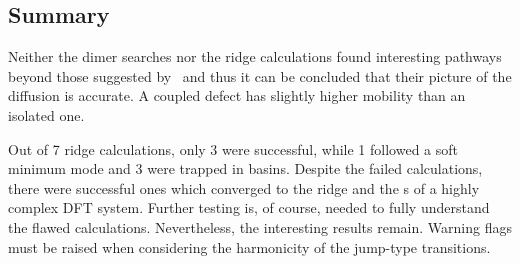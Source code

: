 \subsection{Summary}
Neither the dimer searches nor the ridge calculations found interesting pathways beyond those suggested by~\cite{double-defect-2011} and thus it can be concluded that their picture of the diffusion is accurate.
A coupled defect has slightly higher mobility than an isolated one.

Out of 7 ridge calculations, only 3 were successful, while 1 followed a soft minimum mode and 3 were trapped in basins.
Despite the failed calculations, there were successful ones which converged to the ridge and the s of a highly complex DFT system.
Further testing is, of course, needed to fully understand the flawed calculations.
Nevertheless, the interesting results remain.
Warning flags must be raised when considering the harmonicity of the jump-type transitions.
